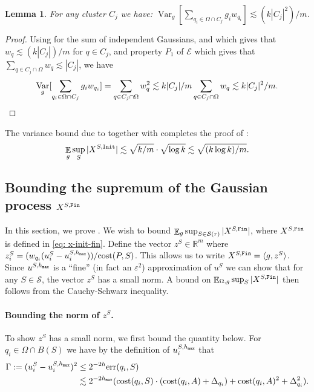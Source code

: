 \documentclass[11pt]{article}
\newtheorem{lemma}{Lemma}[section]
\theoremstyle{restate}
\theoremstyle{definition}
\newcommand{\eps}{\ensuremath{\varepsilon}}
\newcommand{\R}{\ensuremath{\mathbb{R}}}
\DeclareMathOperator*{\var}{\mathrm{Var}}
\newcommand{\E}{\mathop{\mathbb{E}}}
\newcommand{\cost}{\textnormal{cost}}
\newcommand{\uvec}[1]{u^{#1}} %
\newcommand{\uq}[2]{u^{#1}_{#2}} %
\newcommand{\init}{\ensuremath{\textnormal{\texttt{Init}}}}
\newcommand{\fin}{\ensuremath{\textnormal{\texttt{Fin}}}}
\newcommand{\err}{\textnormal{err}}
\newcommand{\inSR}{\in \mathcal{S}(r)}
\newcommand{\hmax}{h_\ensuremath{\textnormal{\texttt{max}}}}
\begin{document}
\begin{lemma}\label{lem: cluster-variance-xinit}
    For any cluster $C_j$ we have:
   $\var_g [{\sum_{q_i \in \Omega \cap C_j}g_i w_{q_i}} ] \lesssim (k|C_j|^2)/m$.
\end{lemma}
\begin{proof}
    Using  for the sum of independent Gaussians, and  which gives that $w_q \lesssim (k|C_j|)/m$ for $q \in C_j$, and property $P_1$ of $\mathcal{E}$ which gives that $\sum_{q \in C_j \cap \Omega} w_q \lesssim |C_j|$, we have
\begin{align*}
        \var_g [{\sum_{q_i \in \Omega \cap C_j}g_i w_{q_i}} ] = \sum_{q \in C_j \cap \Omega} w_q^2 \lesssim k|C_j|/m \sum_{q \in C_j \cap \Omega}{w_q} \lesssim  k|C_j|^2/m. \qedhere
    \end{align*}
\end{proof}
The variance bound due to   together with  completes the proof of  : 
\[\E_{g} \sup_S |X^{S,\init}| \lesssim \sqrt{k/m} \cdot \sqrt{\log k} \lesssim \sqrt{(k\log k)/m}.\]

\subsection{ \texorpdfstring{Bounding the supremum of the Gaussian process $X^{S,\fin}$}{Bounding the Supremum of X{S,Fin}}}
\label{sec:lemXfin}
In this section, we prove . We wish to bound $\E_{g} \sup_{S\inSR} |X^{S, \fin}|$, where $X^{S, \fin}$ is defined in \eqref{eq: x-init-fin}.
Define the vector $z^S \in \R^m$ where $z_i^S = (w_{q_i} (\uq{S}{i} - \uq{S,\hmax}{i}))/\cost(P,S)$. This allows us to write $X^{S,\fin} = \langle g, z^S \rangle$. Since $\uvec{S, \hmax}$ is a ``fine'' (in fact an $\eps^2$) approximation of $\uvec{S}$ we can show that for any $S \in \mathcal S$, the vector $z^S$ has a small norm.  A bound on $\E_{\Omega, g} \sup_S |X^{S,\fin}|$ then follows from the  Cauchy-Schwarz inequality. 

\paragraph{Bounding the norm of $z^S$. }
To show $z^S$ has a small norm, we first bound the quantity below. For  $q_i \in \Omega \cap B(S)$ we have by the definition of $u_i^{S,\hmax}$ that 
\begin{align*}
\Gamma := (\uq{S}{i} - \uq{S, \hmax}{i})^2 
&\leq 2^{-2h}\err(q_i, S)\\
&
\lesssim 2^{-2\hmax}(\cost(q_i,S)\cdot(\cost(q_i,A)+  \Delta_{q_i} )  + \cost(q_i,A)^2 + \Delta_{q_i}^2).
\end{align*}
\end{document}
